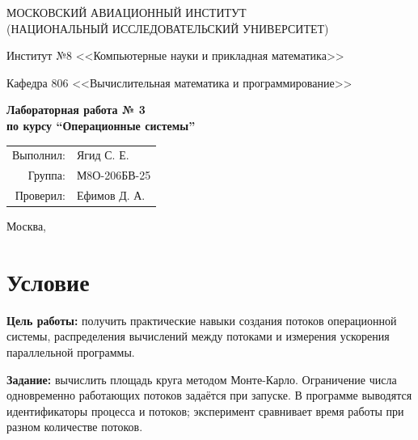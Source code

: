 \documentclass[unicode, 12pt, a4paper, oneside, fleqn]{article}
\begin{document}
\begin{titlepage}
\begin{center}
\large
МОСКОВСКИЙ АВИАЦИОННЫЙ ИНСТИТУТ\\ (НАЦИОНАЛЬНЫЙ ИССЛЕДОВАТЕЛЬСКИЙ УНИВЕРСИТЕТ)

\vspace{20pt}

Институт №8 <<Компьютерные науки и прикладная математика>>

Кафедра 806 <<Вычислительная математика и программирование>>
\end{center}

\vspace{60pt}

\begin{center}
\bfseries
\large
Лабораторная работа № 3 \\по курсу \enquote{Операционные системы}

\vspace{54pt}
\end{center}

\vfill

\begin{flushright}
\large
\begin{tabular}{rl}
Выполнил: & Ягид С. Е. \\
Группа: & М8О-206БВ-25 \\
Проверил: & Ефимов Д. А. \\
\end{tabular}
\end{flushright}

\vspace{92pt}

\begin{center}
\large
Москва, \the\year
\end{center}
\end{titlepage}

\pagebreak

\section{Условие}
{\bfseries Цель работы:} получить практические навыки создания потоков операционной системы, распределения вычислений между потоками и измерения ускорения параллельной программы.

{\bfseries Задание:} вычислить площадь круга методом Монте-Карло. Ограничение числа одновременно работающих потоков задаётся при запуске. В программе выводятся идентификаторы процесса и потоков; эксперимент сравнивает время работы при разном количестве потоков.
\end{document}
